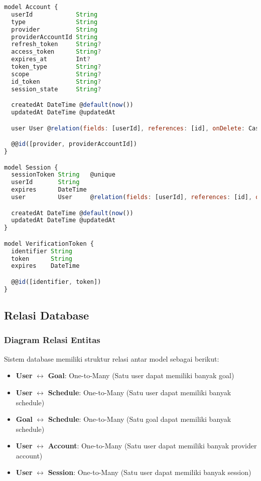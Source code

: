 \begin{lstlisting}[language=JavaScript, caption=Model Autentikasi NextAuth.js]
model Account {
  userId            String
  type              String
  provider          String
  providerAccountId String
  refresh_token     String?
  access_token      String?
  expires_at        Int?
  token_type        String?
  scope             String?
  id_token          String?
  session_state     String?

  createdAt DateTime @default(now())
  updatedAt DateTime @updatedAt

  user User @relation(fields: [userId], references: [id], onDelete: Cascade)

  @@id([provider, providerAccountId])
}

model Session {
  sessionToken String   @unique
  userId       String
  expires      DateTime
  user         User     @relation(fields: [userId], references: [id], onDelete: Cascade)

  createdAt DateTime @default(now())
  updatedAt DateTime @updatedAt
}

model VerificationToken {
  identifier String
  token      String
  expires    DateTime

  @@id([identifier, token])
}
\end{lstlisting}

\subsection{Relasi Database}

\subsubsection{Diagram Relasi Entitas}
Sistem database memiliki struktur relasi antar model sebagai berikut:

\begin{itemize}
\item \textbf{User} $\leftrightarrow$ \textbf{Goal}: One-to-Many (Satu user dapat memiliki banyak goal)
\item \textbf{User} $\leftrightarrow$ \textbf{Schedule}: One-to-Many (Satu user dapat memiliki banyak schedule)
\item \textbf{Goal} $\leftrightarrow$ \textbf{Schedule}: One-to-Many (Satu goal dapat memiliki banyak schedule)
\item \textbf{User} $\leftrightarrow$ \textbf{Account}: One-to-Many (Satu user dapat memiliki banyak provider account)
\item \textbf{User} $\leftrightarrow$ \textbf{Session}: One-to-Many (Satu user dapat memiliki banyak session)
\end{itemize}

